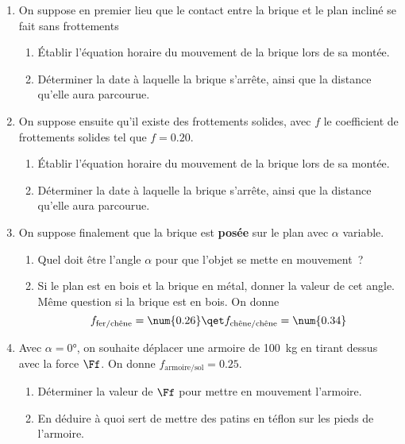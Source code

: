 \documentclass[a4paper, 12pt, final, garamond]{book}
\begin{document}
\begin{enumerate}
    \item On suppose en premier lieu que le contact entre la brique et le plan
        incliné se fait sans frottements
        \begin{enumerate}
            \item Établir l'équation horaire du mouvement de la brique lors de
                sa montée.
            \item Déterminer la date à laquelle la brique s'arrête, ainsi que la
                distance qu'elle aura parcourue.
        \end{enumerate}
    \item On suppose ensuite qu'il existe des frottements solides, avec $f$ le
        coefficient de frottements solides tel que $f = \num{0.20}$.
        \begin{enumerate}
            \item Établir l'équation horaire du mouvement de la brique lors de
                sa montée.
            \item Déterminer la date à laquelle la brique s'arrête, ainsi que la
                distance qu'elle aura parcourue.
        \end{enumerate}
    \item On suppose finalement que la brique est \textbf{posée} sur le plan
        avec $\alpha$ variable.
        \begin{enumerate}
            \item Quel doit être l'angle $\alpha$ pour que l'objet se mette en
                mouvement~?
            \item Si le plan est en bois et la brique en métal, donner la valeur
                de cet angle. Même question si la brique est en bois. On donne
                \[
                    f_{\text{fer/chêne}} = \num{0.26}
                    \qet
                    f_{\text{chêne/chêne}} = \num{0.34}
                \]
        \end{enumerate}
    \item Avec $\alpha = \ang{0;;}$, on souhaite déplacer une armoire de
        \SI{100}{kg} en tirant dessus avec la force $\Ff$. On donne
        $f_{\text{armoire/sol}} = \num{0.25}$.
        \begin{enumerate}
            \item Déterminer la valeur de $\Ff$ pour mettre en mouvement
                l'armoire.
            \item En déduire à quoi sert de mettre des patins en téflon sur les
                pieds de l'armoire.
        \end{enumerate} 
\end{enumerate}
\end{document}
